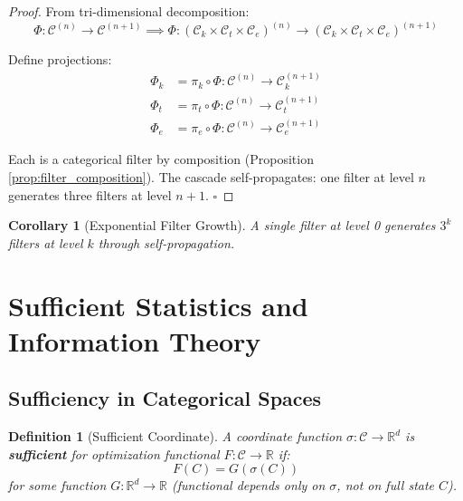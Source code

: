 \documentclass[12pt,a4paper]{article}
\newtheorem{corollary}[theorem]{Corollary}
\newtheorem{definition}[theorem]{Definition}
\begin{document}
\begin{proof}
From tri-dimensional decomposition:
\begin{equation}
\Phi: \mathcal{C}^{(n)} \to \mathcal{C}^{(n+1)} \implies \Phi: (\mathcal{C}_k \times \mathcal{C}_t \times \mathcal{C}_e)^{(n)} \to (\mathcal{C}_k \times \mathcal{C}_t \times \mathcal{C}_e)^{(n+1)}
\end{equation}

Define projections:
\begin{align}
\Phi_k &= \pi_k \circ \Phi: \mathcal{C}^{(n)} \to \mathcal{C}_k^{(n+1)} \\
\Phi_t &= \pi_t \circ \Phi: \mathcal{C}^{(n)} \to \mathcal{C}_t^{(n+1)} \\
\Phi_e &= \pi_e \circ \Phi: \mathcal{C}^{(n)} \to \mathcal{C}_e^{(n+1)}
\end{align}

Each is a categorical filter by composition (Proposition \ref{prop:filter_composition}). The cascade self-propagates: one filter at level $n$ generates three filters at level $n+1$. $\square$
\end{proof}

\begin{corollary}[Exponential Filter Growth]
\label{cor:exponential_filters}
A single filter at level 0 generates $3^k$ filters at level $k$ through self-propagation.
\end{corollary}

\section{Sufficient Statistics and Information Theory}

\subsection{Sufficiency in Categorical Spaces}

\begin{definition}[Sufficient Coordinate]
\label{def:sufficient_coordinate}
A coordinate function $\sigma: \mathcal{C} \to \mathbb{R}^d$ is \textbf{sufficient} for optimization functional $F: \mathcal{C} \to \mathbb{R}$ if:
\begin{equation}
F(C) = G(\sigma(C))
\end{equation}
for some function $G: \mathbb{R}^d \to \mathbb{R}$ (functional depends only on $\sigma$, not on full state $C$).
\end{definition}
\end{document}
